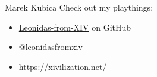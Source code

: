 \documentclass{beamer}
\begin{document}
{
%
\begin{frame}[plain]
  \begin{columns}
  \begin{block}{\color{white}Marek Kubica}
    \color{white}
    Check out my playthings:
    \begin{itemize}
      \color{white}
      \item \href{https://github.com/Leonidas-from-XIV}{Leonidas-from-XIV} on GitHub
      \item \href{https://twiter.com/leonidasfromxiv}{@leonidasfromxiv}
      \item \url{https://xivilization.net/}
    \end{itemize}
  \end{block}
  \end{columns}
\end{frame}
}
\end{document}
